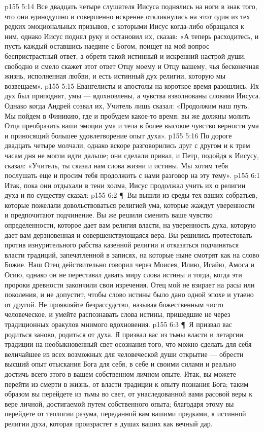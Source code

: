 \vs p155 5:14 Все двадцать четыре слушателя Иисуса поднялись на ноги в знак того, что они единодушно и совершенно искренне откликнулись на этот один из тех редких эмоциональных призывов, с которыми Иисус когда\hyp{}либо обращался к ним, однако Иисус поднял руку и остановил их, сказав: «А теперь расходитесь, и пусть каждый оставшись наедине с Богом, поищет на мой вопрос беспристрастный ответ, а обретя такой истинный и искренний настрой души, свободно и смело скажет этот ответ Отцу моему и Отцу вашему, чья бесконечная жизнь, исполненная любви, и есть истинный дух религии, которую мы возвещаем».
\vs p155 5:15 Евангелисты и апостолы на короткое время разошлись. Их дух был приподнят, умы --- вдохновлены, а чувства взволнованы словами Иисуса. Однако когда Андрей созвал их, Учитель лишь сказал: «Продолжим наш путь. Мы пойдем в Финикию, где и пробудем какое\hyp{}то время; вы же должны молить Отца преобразить ваши эмоции ума и тела в более высокое чувство верности ума и приносящий большее удовлетворение опыт духа».
\vs p155 5:16 По дороге двадцать четыре молчали, однако вскоре разговорились друг с другом и к трем часам дня не могли идти дальше; они сделали привал, и Петр, подойдя к Иисусу, сказал: «Учитель, ты сказал нам слова жизни и истины. Мы хотим тебя послушать еще и просим тебя продолжить с нами разговор на эту тему».
\vs p155 6:1 Итак, пока они отдыхали в тени холма, Иисус продолжал учить их о религии духа и по существу сказал:
\vs p155 6:2 \P\ Вы вышли из среды тех ваших собратьев, которые пожелали довольствоваться религией ума, которые жаждут уверенности и предпочитают подчинение. Вы же решили сменить ваше чувство определенности, которое дает вам религия власти, на уверенность духа, которую дает вам дерзновенная и совершенствующаяся вера. Вы решились протестовать против изнурительного рабства казенной религии и отказаться подчиняться власти традиций, запечатленной в записях, на которые ныне смотрят как на слово Божие. Наш Отец действительно говорил через Моисея, Илию, Исайю, Амоса и Осию, однако он не переставал давать миру слова истины и тогда, когда эти пророки древности закончили свои изречения. Отец мой не взирает на расы или поколения, и не допустит, чтобы слово истины было дано одной эпохе и утаено от другой. Не проявляйте безрассудство, называя божественным чисто человеческое, и умейте распознавать слова истины, пришедшие не через традиционных оракулов мнимого вдохновения.
\vs p155 6:3 \P\ Я призвал вас родиться заново, родиться от духа. Я призвал вас из тьмы власти и летаргии традиции на необыкновенный свет осознания того, что можно сделать для себя величайшее из всех возможных для человеческой души открытие --- обрести высший опыт отыскания Бога для себя, в себе и своими силами и реально достичь всего этого в вашем собственном личном опыте. Итак, вы можете перейти из смерти в жизнь, от власти традиции к опыту познания Бога; таким образом вы перейдете из тьмы во свет, от унаследованной вами расовой веры к вере личной, достигаемой путем собственного опыта; благодаря этому вы перейдете от теологии разума, переданной вам вашими предками, к истинной религии духа, которая произрастет в душах ваших как вечный дар.
